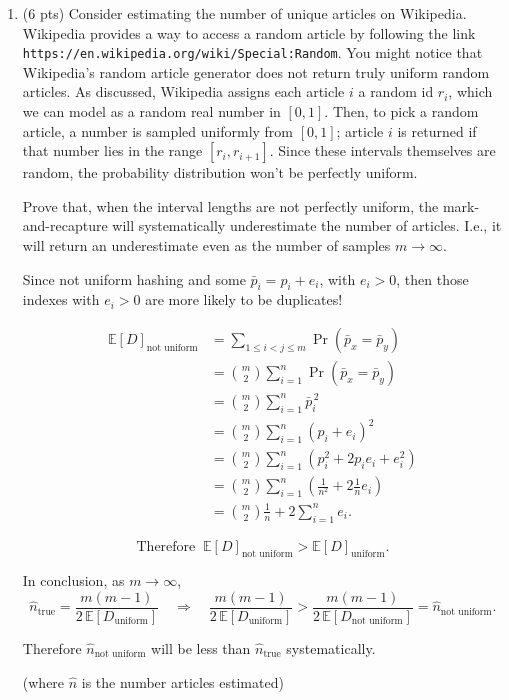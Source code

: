 \documentclass[11pt]{article}
\begin{document}
\begin{enumerate}[label=\arabic*.]
	\[
	m=O\!\left(\frac{\sqrt{n}}{a}\right),
	\qquad
	\text{let } a=\epsilon,
	\qquad
	\boxed{
	m=O\!\left(\frac{\sqrt{n}}{\epsilon}\right).
	}
	\]

	\item (6 pts) Consider estimating the number of unique articles on Wikipedia. Wikipedia provides a way to access a random article by following the link \texttt{https://en.wikipedia.org/wiki/Special:Random}. You might notice that Wikipedia's random article generator does not return truly uniform random articles. As discussed, Wikipedia assigns each article $i$ a random id $r_i$, which we can model as a random real number in $[0,1]$. Then, to pick a random article, a number is sampled uniformly from $[0,1]$; article $i$ is returned if that number lies in the range $[r_i, r_{i+1}]$. Since these intervals themselves are random, the probability distribution won't be perfectly uniform.

	Prove that, when the interval lengths are not perfectly uniform, the mark-and-recapture will systematically underestimate the number of articles. I.e., it will return an underestimate even as the number of samples $m\to\infty$.



\medskip

\noindent Since not uniform hashing and some $\bar{p}_i = p_i + e_i$, with $e_i>0$,
then those indexes with $e_i>0$ are more likely to be duplicates!

\begin{align*}
\mathbb{E}[D]_{\text{not uniform}}
&= \sum_{1\le i<j\le m} \Pr(\bar{p}_x=\bar{p}_y) \\
&= \binom{m}{2}\sum_{i=1}^{n}\Pr(\bar{p}_x=\bar{p}_y) \\
&= \binom{m}{2}\sum_{i=1}^{n}\bar{p}_i^{\,2} \\
&= \binom{m}{2}\sum_{i=1}^{n}(p_i+e_i)^2 \\
&= \binom{m}{2}\sum_{i=1}^{n}\left(p_i^2+2p_ie_i+e_i^2\right) \\
&= \binom{m}{2}\sum_{i=1}^{n}\left(\frac{1}{n^2}+2\frac{1}{n}e_i\right) \\
&= \binom{m}{2}\frac{1}{n} + 2\sum_{i=1}^{n} e_i .
\end{align*}

\[
\text{Therefore }\ \mathbb{E}[D]_{\text{not uniform}} > \mathbb{E}[D]_{\text{uniform}}.
\]

\medskip

\noindent In conclusion, as $m\to\infty$,
\[
\hat{n}_{\text{true}}=\frac{m(m-1)}{2\,\mathbb{E}[D_{\text{uniform}}]}
\quad\Rightarrow\quad
\frac{m(m-1)}{2\,\mathbb{E}[D_{\text{uniform}}]}
>
\frac{m(m-1)}{2\,\mathbb{E}[D_{\text{not uniform}}]}
=
\hat{n}_{\text{not uniform}}.
\]

\noindent Therefore $\hat{n}_{\text{not uniform}}$ will be less than $\hat{n}_{\text{true}}$
systematically.

\hfill (where $\hat{n}$ is the number articles estimated)
\end{enumerate}
\end{document}
